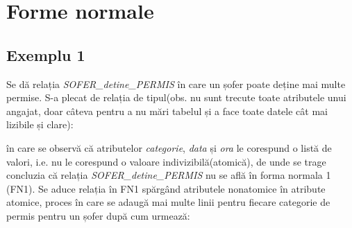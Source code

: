 \documentclass[12pt, a4paper]{article}
\begin{document}
\section{Forme normale}

\subsection*{Exemplu 1}
Se dă relația \emph{SOFER\_detine\_PERMIS} în care un șofer poate deține mai multe permise. S-a plecat de relația de tipul(obs. nu sunt trecute toate atributele unui angajat, doar câteva pentru a nu mări tabelul și a face toate datele cât mai lizibile și clare):

\begin{table}[!htbp]
\caption{Relația nu e în FN1}\label{tab1}
\end{table}

în care se observă că atributelor \emph{categorie}, \emph{data} și \emph{ora} le corespund o listă de valori, i.e. nu le corespund o valoare indivizibilă(atomică), de unde se trage concluzia că relația \emph{SOFER\_detine\_PERMIS} nu se află în forma normala 1 (FN1). Se aduce relația în FN1 spărgând atributele nonatomice în atribute atomice, proces în care se adaugă mai multe linii pentru fiecare categorie de permis pentru un șofer după cum urmează:
\end{document}
